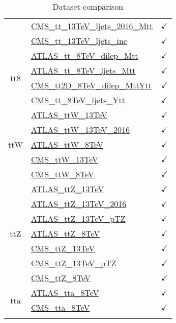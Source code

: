 \documentclass{article}
\begin{document}
\begin{longtable}{|c|l|c|}
 & \href{https://arxiv.org}{CMS_tt_13TeV_ljets_2016_Mtt}  & $\checkmark$\\ \cline{2-3}
 & \href{https://arxiv.org}{CMS_tt_13TeV_ljets_inc}  & $\checkmark$
\\ \hline
\multirow{4}{*}{tt8}
 & \href{https://arxiv.org}{ATLAS_tt_8TeV_dilep_Mtt}  & $\checkmark$\\ \cline{2-3}
 & \href{https://arxiv.org}{ATLAS_tt_8TeV_ljets_Mtt}  & $\checkmark$\\ \cline{2-3}
 & \href{https://arxiv.org}{CMS_tt2D_8TeV_dilep_MttYtt}  & $\checkmark$\\ \cline{2-3}
 & \href{https://arxiv.org}{CMS_tt_8TeV_ljets_Ytt}  & $\checkmark$
\\ \hline
\multirow{5}{*}{ttW}
 & \href{https://arxiv.org}{ATLAS_ttW_13TeV}  & $\checkmark$\\ \cline{2-3}
 & \href{https://arxiv.org}{ATLAS_ttW_13TeV_2016}  & $\checkmark$\\ \cline{2-3}
 & \href{https://arxiv.org}{ATLAS_ttW_8TeV}  & $\checkmark$\\ \cline{2-3}
 & \href{https://arxiv.org}{CMS_ttW_13TeV}  & $\checkmark$\\ \cline{2-3}
 & \href{https://arxiv.org}{CMS_ttW_8TeV}  & $\checkmark$
\\ \hline
\multirow{7}{*}{ttZ}
 & \href{https://arxiv.org}{ATLAS_ttZ_13TeV}  & $\checkmark$\\ \cline{2-3}
 & \href{https://arxiv.org}{ATLAS_ttZ_13TeV_2016}  & $\checkmark$\\ \cline{2-3}
 & \href{https://arxiv.org}{ATLAS_ttZ_13TeV_pTZ}  & $\checkmark$\\ \cline{2-3}
 & \href{https://arxiv.org}{ATLAS_ttZ_8TeV}  & $\checkmark$\\ \cline{2-3}
 & \href{https://arxiv.org}{CMS_ttZ_13TeV}  & $\checkmark$\\ \cline{2-3}
 & \href{https://arxiv.org}{CMS_ttZ_13TeV_pTZ}  & $\checkmark$\\ \cline{2-3}
 & \href{https://arxiv.org}{CMS_ttZ_8TeV}  & $\checkmark$
\\ \hline
\multirow{2}{*}{tta}
 & \href{https://arxiv.org}{ATLAS_tta_8TeV}  & $\checkmark$\\ \cline{2-3}
 & \href{https://arxiv.org}{CMS_tta_8TeV}  & $\checkmark$
\\ \hline
\caption{Dataset comparison}
\end{longtable}
\end{document}
